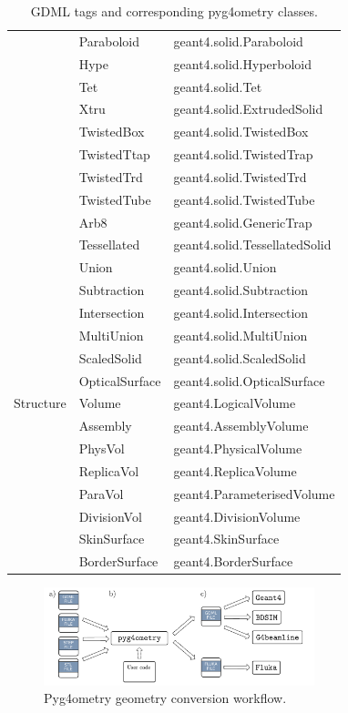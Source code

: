 \documentclass[final,5p,times,twocolumn]{elsarticle}
\begin{document}
\begin{table}[hbt!]
\begin{tabular}{ l l l }
				& Paraboloid				& geant4.solid.Paraboloid			\\
				& Hype					& geant4.solid.Hyperboloid		\\
				& Tet						& geant4.solid.Tet				\\
				& Xtru					& geant4.solid.ExtrudedSolid		\\
				& TwistedBox				& geant4.solid.TwistedBox		\\
				& TwistedTtap				& geant4.solid.TwistedTrap		\\
				& TwistedTrd				& geant4.solid.TwistedTrd 		\\
				& TwistedTube				& geant4.solid.TwistedTube		\\
				& Arb8					& geant4.solid.GenericTrap		\\
				& Tessellated				& geant4.solid.TessellatedSolid 	\\
				& Union					& geant4.solid.Union				\\
				& Subtraction				& geant4.solid.Subtraction			\\
				& Intersection				& geant4.solid.Intersection 		\\
				& MultiUnion				& geant4.solid.MultiUnion 			\\
				& ScaledSolid				& geant4.solid.ScaledSolid		\\				
	  			& OpticalSurface			& geant4.solid.OpticalSurface		\\ \hline
Structure			& Volume					& geant4.LogicalVolume			\\
				& Assembly				& geant4.AssemblyVolume 		\\
				& PhysVol					& geant4.PhysicalVolume			\\ 
				& ReplicaVol				& geant4.ReplicaVolume			\\ 
				& ParaVol					& geant4.ParameterisedVolume	\\ 
				& DivisionVol				& geant4.DivisionVolume			\\
				& SkinSurface				& geant4.SkinSurface			\\ 
				& BorderSurface			& geant4.BorderSurface			\\ \hline

\end{tabular}
\label{tab:gdml-tags}
\caption{GDML tags and corresponding pyg4ometry classes.}
\end{table}

\begin{figure}[hbt]
  \normalsize
  \centering
  \includegraphics[width=0.7\textwidth]{./diagrams/workflow.pdf}
  \caption{\label{fig:workflow}Pyg4ometry geometry conversion workflow.}
\end{figure}
\end{document}
